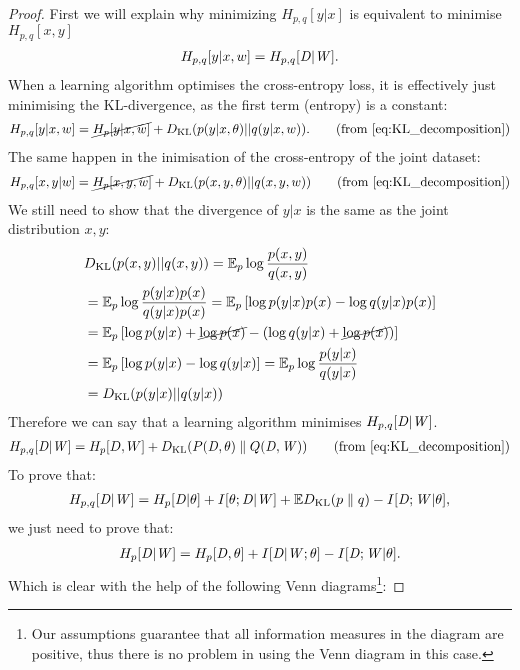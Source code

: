 \begin{proof}
  First we will explain why minimizing $H_{p,q}[y|x]$ is equivalent to minimise $H_{p,q}[x,y]$
  \begin{align}
    H_{p,q}[y|x,w]=H_{p,q}[{\mathit{D}} |{\mathit{W}}].
  \end{align}
  When a learning algorithm optimises the cross-entropy loss, it is effectively just minimising the KL-divergence, as the first term (entropy) is a constant:
  \begin{align}
    H_{p,q}[y|x,w] = \cancel{H_{p}[y|x, w]} + \KL(p(y|x, \theta)||q(y|x, w)).  \tag{\text{from \eqref{eq:KL_decomposition}}}
  \end{align}
  The same happen in the inimisation of the cross-entropy of the joint dataset:
  \begin{align}
    H_{p,q}[x,y|w] = \cancel{H_{p}[x,y, w]} + \KL(p(x, y, \theta)||q(x, y, w))  \tag{\text{from \eqref{eq:KL_decomposition}}}
  \end{align}
   We still need to show that the divergence of $y|x$ is the same as the joint distribution $x,y$:
   \begin{align}
    &D_{\mathrm{KL}}(p(x,y) || q(x,y)) = \mathbb{E}_p \log \frac{p(x,y)}{q(x,y)}\\
    &= \mathbb{E}_p \log \frac{p(y|x)p(x)}{q(y|x)p(x)} = \mathbb{E}_p \left[\log p(y|x)p(x)- \log q(y|x)p(x)\right]\\
    &= \mathbb{E}_p \left[ \log p(y|x) + \cancel{\log p(x)} - \left( \log q(y|x) + \cancel{\log p(x)} \right) \right]\\
    &= \mathbb{E}_p \left[\log p(y|x) - \log q(y|x) \right]= \mathbb{E}_p \log \frac{p(y|x)}{q(y|x)}\\
    &= D_{\mathrm{KL}}(p(y|x)||q(y|x))
  \end{align}
  Therefore we can say that a learning algorithm minimises $H_{p,q}[{\mathit{D}}|{\mathit{W}}]$.
  \begin{align}
    H_{p,q}[\rvD|\rvW] = H_{p}[D, W] + \KL(P(\rvD, \theta) \parallel Q(\rvD, \rvW))  \tag{\text{from \eqref{eq:KL_decomposition}}}
  \end{align}
   To prove that:
   \begin{align*}
    H_{p,q}[{\mathit{D}}|{\mathit{W}}]=H_p[{\mathit{D}}|\theta] + I[\theta;{\mathit{D}}|{\mathit{W}}] +
    \mathbb{E}D_{\mathrm{KL}}(p \parallel q)-I[{\mathit{D}};{\mathit{W}}|\theta],
   \end{align*} we just need to prove that:
   \begin{align}
    H_p[{\mathit{D}}|{\mathit{W}}] = H_{p}[{\mathit{D}}, \theta] + I[{\mathit{D}}|{\mathit{W}}; \theta] - I[{\mathit{D}}; {\mathit{W}}|\theta].
  \end{align}
  Which is clear with the help of the following Venn diagrams\footnote{Our assumptions guarantee that all information measures in the diagram are positive, thus there is no problem in using the Venn diagram in this case.}:

\end{proof}
